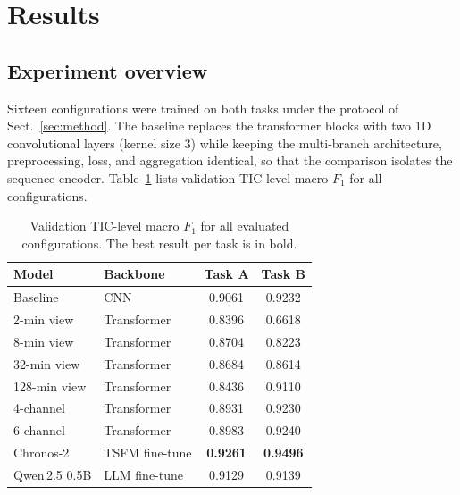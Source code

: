 \documentclass{aa}
\begin{document}


    \section{Results}
    \label{sec:results}

    \subsection{Experiment overview}

    Sixteen configurations were trained on both tasks under the protocol of
    Sect.~\ref{sec:method}. The baseline replaces the transformer blocks with two 1D
    convolutional layers (kernel size 3) while keeping the multi-branch architecture,
    preprocessing, loss, and aggregation identical, so that the comparison isolates the
    sequence encoder. Table~\ref{tab:summary} lists validation TIC-level macro $F_1$ for all
    configurations.

    \begin{table}[!t]
        \caption{Validation TIC-level macro $F_1$ for all evaluated configurations. The best
        result per task is in bold.}
        \label{tab:summary}
        \centering
        \small
        \begin{tabular}{llcc}
            \toprule
            Model          & Backbone       & Task A          & Task B          \\
            \midrule
            Baseline       & CNN            & 0.9061          & 0.9232          \\
            \midrule
            2-min view     & Transformer    & 0.8396          & 0.6618          \\
            8-min view     & Transformer    & 0.8704          & 0.8223          \\
            32-min view    & Transformer    & 0.8684          & 0.8614          \\
            128-min view   & Transformer    & 0.8436          & 0.9110          \\
            \midrule
            4-channel      & Transformer    & 0.8931          & 0.9230          \\
            6-channel      & Transformer    & 0.8983          & 0.9240          \\
            \midrule
            Chronos-2      & TSFM fine-tune & \textbf{0.9261} & \textbf{0.9496} \\
            Qwen\,2.5 0.5B & LLM fine-tune  & 0.9129          & 0.9139          \\
            \bottomrule
        \end{tabular}
    \end{table}
\end{document}
